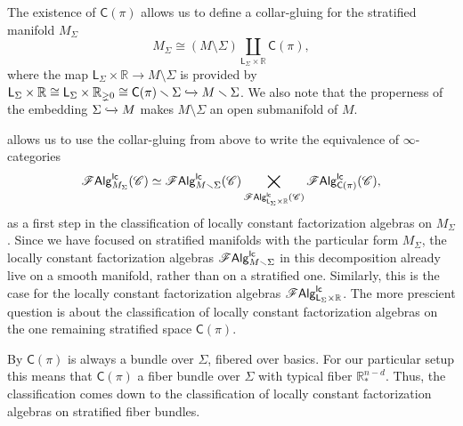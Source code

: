 \documentclass[../text]{subfiles}
\begin{document}
\begin{construction}
    The existence of $\mathsf{C}(\pi)$ allows us to define a collar-gluing for the stratified manifold $M_\Sigma$
    \begin{equation}\label{eq:M_Sigma_decomposition}
        M_\Sigma \cong \left( M \setminus \Sigma \right) \coprod_{\mathsf{L}_\Sigma \times \mathbb{R}} \mathsf{C}(\pi),
    \end{equation}
    where the map $\mathsf{L}_\Sigma \times \mathbb{R} \rightarrow M \setminus \Sigma$ is provided by $\mathsf{L}_\Sigma \times \mathbb{R} \cong \mathsf{L}_\Sigma \times \mathbb{R}_{\gneq 0} \cong \mathsf{C}(\pi) \setminus \Sigma \xhookrightarrow{} M \setminus \Sigma$. We also note that the properness of the embedding $\Sigma \xhookrightarrow{} M$ makes $M \setminus \Sigma$ an open submanifold of $M$.
\end{construction}


 allows us to use the collar-gluing from above to write the equivalence of $\infty$-categories
%
\begin{equation}
    \lcfa_{M_\Sigma} (\catC) \simeq \lcfa_{M \setminus \Sigma} (\catC) \bigtimes_{\lcfa_{\mathsf{L}_\Sigma \times \mathbb{R}} (\catC)} \lcfa_{\mathsf{C}(\pi)} (\catC),
\end{equation}
%
as a first step in the classification of locally constant factorization algebras on $M_{\Sigma}$. Since we have focused on stratified manifolds with the particular form $M_{\Sigma}$, the locally constant factorization algebras $\lcfa_{M \setminus \Sigma}$ in this decomposition already live on a smooth manifold, rather than on a stratified one. Similarly, this is the case for the locally constant factorization algebras $\lcfa_{\mathsf{L}_\Sigma \times \mathbb{R}}$. The more prescient question is about the classification of locally constant factorization algebras on the one remaining stratified space $\mathsf{C}(\pi)$. 

By \cite[ex.3.6.6]{aft_localstrut} $\mathsf{C}(\pi)$ is always a bundle over $\Sigma$, fibered over basics. For our particular setup this means that $\mathsf{C}(\pi)$ a fiber bundle over $\Sigma$ with typical fiber $\mathbb{R}^{n-d}_*$. Thus, the classification comes down to the classification of locally constant factorization algebras on stratified fiber bundles.
\end{document}
